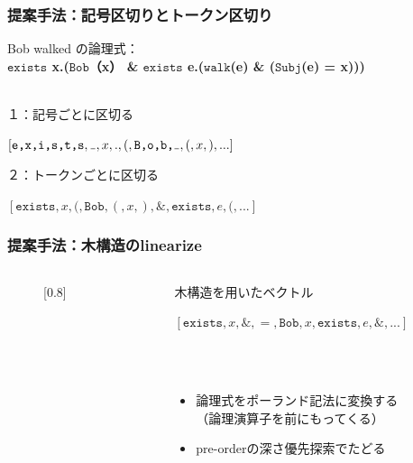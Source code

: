 \documentclass[dvipdfmx]{beamer}
\newcommand{\LF}[1]{\ensuremath{\texttt{#1}}}
\newcommand\vartextvisiblespace[1][.5em]{%
  \makebox[#1]{%
    \kern.07em
    \vrule height.3ex
    \hrulefill
    \vrule height.3ex
    \kern.07em
  }%
}
\begin{document}
\begin{frame}
\frametitle{提案手法：記号区切りとトークン区切り}
Bob walked の論理式：\\
\textbf{
  \LF{exists} x.(\LF{Bob}（x） \& \LF{exists} e.(\LF{walk}(e) \& (\LF{Subj}(e) = x)))
}
\\~\
\begin{block}{１：記号ごとに区切る}
\begin{center}
$[\LF{e,x,i,s,t,s}, {\tt \vartextvisiblespace}, x,.,(,\LF{B,o,b,}{\tt \vartextvisiblespace},(,x,),...]$
\end{center}
\end{block}
\begin{block}{２：トークンごとに区切る}
\begin{center}
  $[\LF{exists},x,(,\LF{Bob},(,x,),\&,\LF{exists},e,(,...]$
\end{center}
\end{block}
\end{frame}


\begin{frame}
\frametitle{提案手法：木構造のlinearize}
\begin{columns}[t]
    \begin{column}{0.4\textwidth} %
        \begin{figure}[h]
        \begin{center}
          \scalebox{}[0.8]{
          }
        \end{center}
        \end{figure}
    \end{column}
    \begin{column}{0.6\textwidth} %
      \begin{block}{木構造を用いたベクトル}
        \begin{center}
          $[\LF{exists},x,\&,=,\LF{Bob},x,\LF{exists},e,\&,...]$
        \end{center}
      \end{block}
      \\~\
      \begin{itemize}
        \item 論理式をポーランド記法に変換する\\（論理演算子を前にもってくる）
        \item pre-orderの深さ優先探索でたどる
      \end{itemize}
    \end{column}
\end{columns}

\end{frame}
\end{document}
